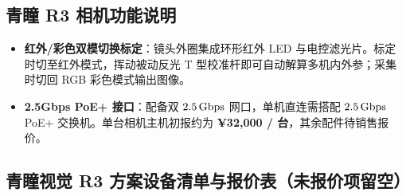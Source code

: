 \documentclass[10pt, a4paper]{ctexart}
\begin{document}
\subsection{青瞳 R3 相机功能说明}

\begin{itemize}
  \item \textbf{红外/彩色双模切换标定}：镜头外圈集成环形红外 LED 与电控滤光片。标定时切至红外模式，挥动被动反光 T 型校准杆即可自动解算多机内外参；采集时切回 RGB 彩色模式输出图像。
  \item \textbf{2.5Gbps PoE+ 接口}：配备双 $2.5\text{\,Gbps}$ 网口，单机直连需搭配 $2.5\text{\,Gbps}$ PoE+ 交换机。单台相机主机初报约为 \textbf{¥32,000 / 台}，其余配件待销售报价。
\end{itemize}

\subsection{青瞳视觉 R3 方案设备清单与报价表（未报价项留空）}
\end{document}

